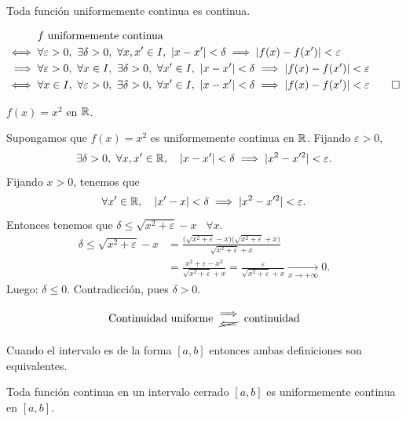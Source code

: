 \documentclass[11pt,a4paper]{article}
\begin{document}
\begin{proposicion}
Toda función uniformemente continua es continua.
\end{proposicion}

\begin{demo}
\begin{align*}
  &f \text{ uniformemente continua}\\
  \iff{}& \forall\varepsilon>0,\ \exists\delta>0,\ \forall x,x'\in I,\ \abs{x-x'}<\delta\implies\abs{f(x)-f(x')}<\varepsilon\\
  \implies{}& \forall\varepsilon>0,\ \forall x\in I,\ \exists\delta>0,\ \forall x'\in I,\ \abs{x-x'}<\delta\implies\abs{f(x)-f(x')}<\varepsilon\\
  \iff{}& \forall x\in I,\ \forall\varepsilon>0,\ \exists\delta>0,\ \forall x'\in I,\ \abs{x-x'}<\delta\implies\abs{f(x)-f(x')}<\varepsilon \qedhere
\end{align*}
\end{demo}

\begin{contraejemplo}
$f(x)=x^2$ en $\mathbb{R}$.

Supongamos que $f(x)=x^2$ es uniformemente continua en $\mathbb{R}$. Fijando $\varepsilon>0$,
\[
  \exists\delta>0,\ \forall x,x'\in\mathbb{R},\quad \lvert x-x'\rvert<\delta\implies\lvert x^2-x'^2\rvert<\varepsilon.
\]
Fijando $x>0$, tenemos que
\[
  \forall x'\in\mathbb{R},\quad \lvert x'-x\rvert<\delta\implies\lvert x^2-x'^2\rvert<\varepsilon.
\]
Entonces tenemos que $\delta\leq\sqrt{x^2+\varepsilon}-x$ \ $\forall x$.
\begin{align*}
  \delta\leq\sqrt{x^2+\varepsilon}-x
  &= \frac{\big(\sqrt{x^2+\varepsilon}-x\big)\big(\sqrt{x^2+\varepsilon}+x\big)}{\sqrt{x^2+\varepsilon}+x}\\
  &= \frac{x^2+\varepsilon-x^2}{\sqrt{x^2+\varepsilon}+x}
   = \frac{\varepsilon}{\sqrt{x^2+\varepsilon}+x}\xrightarrow[x\to+\infty]{}0.
\end{align*}
Luego: $\delta\leq0$. Contradicción, pues $\delta>0$.
\end{contraejemplo}

\[
  \text{Continuidad uniforme}\ \mathrel{\begin{array}{@{}c@{}}\Longrightarrow\\[-0.3em] \cancel{\Longleftarrow}\end{array}}\ \text{continuidad}
\]

Cuando el intervalo es de la forma $[a,b]$ entonces ambas definiciones son equivalentes.

\begin{teorema}
Toda función continua en un intervalo cerrado $[a,b]$ es uniformemente continua en $[a,b]$.
\end{teorema}
\end{document}
